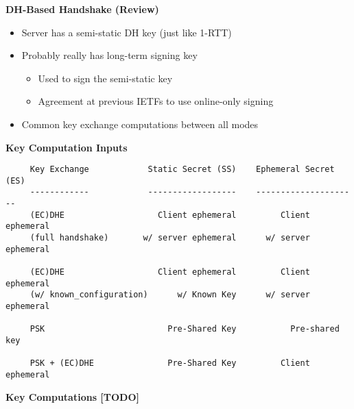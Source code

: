 \documentclass[helvetica]{seminar}
\newcommand{\heading}[1]{%
  \begin{center} 
    \large\bf 
    #1 
  \end{center} 
  \vspace{.4 in}}
\begin{document}
\begin{slide}
\heading{DH-Based Handshake (Review)}

\begin{itemize}
\item Server has a semi-static DH key (just like 1-RTT)
\item Probably really has long-term signing key
  \begin{itemize}
  \item Used to sign the semi-static key
  \item Agreement at previous IETFs to use online-only signing
  \end{itemize}

\item Common key exchange computations between all modes
\end{itemize}
\end{slide}


\begin{slide}
\heading{Key Computation Inputs}

\begin{footnotesize}
\begin{verbatim}
     Key Exchange            Static Secret (SS)    Ephemeral Secret (ES)
     ------------            ------------------    ---------------------
     (EC)DHE                   Client ephemeral         Client ephemeral
     (full handshake)       w/ server ephemeral      w/ server ephemeral

     (EC)DHE                   Client ephemeral         Client ephemeral
     (w/ known_configuration)      w/ Known Key      w/ server ephemeral

     PSK                         Pre-Shared Key           Pre-shared key

     PSK + (EC)DHE               Pre-Shared Key         Client ephemeral
\end{verbatim}
\end{footnotesize}
\end{slide}


\begin{slide}
\heading{Key Computations [TODO]}

\end{slide}
\end{document}
